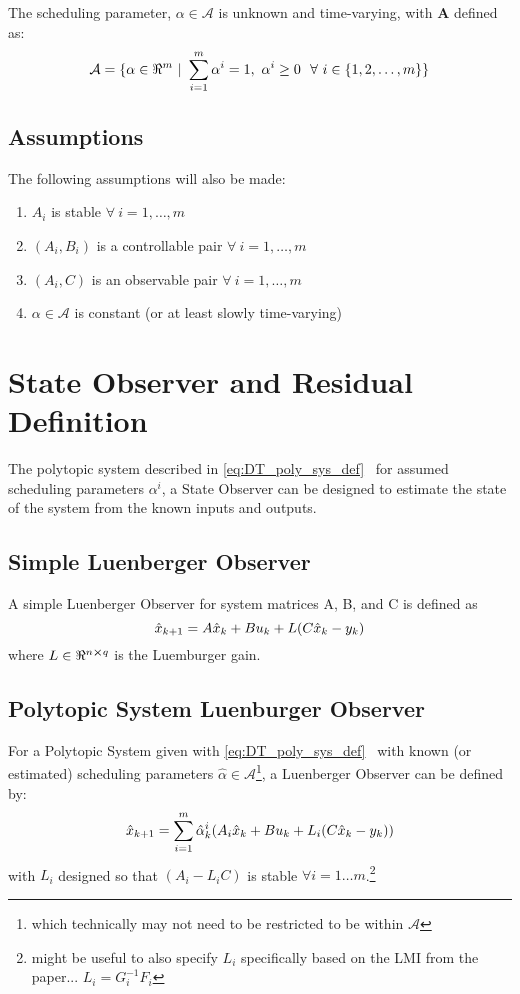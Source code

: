 \documentclass[]{article}
\begin{document}
The scheduling parameter, $\alpha \in \mathcal{A}$ is unknown and time-varying, with $\mathbf{A}$ defined as:
\begin{equation}\label{eq:alpha_set}
	\mathcal{A} = \{\alpha\in \real^m \ | \ \sum_{i=1}^m \alpha^i = 1, \ \alpha^i \geq 0 \ \ \forall \ i \in \{1,2,\dots,m\}\}
\end{equation}


\subsection{Assumptions}
The following assumptions will also be made:

\begin{enumerate}
	\item $A_i$ is stable $\forall \ i = 1, \dots, m$
	\item $(A_i, B_i)$ is a controllable pair $\forall \ i = 1, \dots, m$
	\item $(A_i, C)$ is an observable pair $\forall \ i = 1, \dots, m$
	\item $\alpha \in \mathcal{A}$ is constant (or at least slowly time-varying)
\end{enumerate}


\newpage
\section{State Observer and Residual Definition}
The polytopic system described in \eqref{eq:DT_poly_sys_def} \ for assumed scheduling parameters $\alpha^i$, a State Observer can be designed to estimate the state of the system from the known inputs and outputs.\\

\subsection{Simple Luenberger Observer}
A simple Luenberger Observer for system matrices A, B, and C is defined as
\begin{equation}\label{eq:simple_L_Observer}
	\hat{x}_{k+1} = A \hat{x}_k + B u_k + L \qty(C \hat{x}_k - y_k)
\end{equation}
where $L \in \real^{n \cross q}$ is the Luemburger gain.

\subsection{Polytopic System Luenburger Observer}
For a Polytopic System given with \eqref{eq:DT_poly_sys_def} \ with known (or estimated) scheduling parameters $\hat{\alpha} \in \mathcal{A}$\footnote{which technically may not need to be restricted to be within $\mathcal{A}$}, a Luenberger Observer can be defined by:
\begin{equation}\label{eq:DT_poly_l_observer}
	\hat{x}_{k+1} = \sum_{i=1}^m \hat{\alpha}_k^i \qty(A_i \hat{x}_k + B u_k + L_i \qty(C \hat{x}_k - y_k))
\end{equation}
with $L_i$ designed so that $(A_i - L_i C)$ is stable $\forall i = 1 \dots m$.\footnote{might be useful to also specify $L_i$ specifically based on the LMI from the paper... $L_i = G_i^{-1} F_i$}
\end{document}
